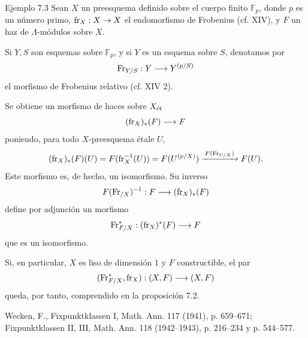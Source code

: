 \begin{statement}{Ejemplo 7.3}
Sean $X$ un preesquema definido sobre el cuerpo finito $\mathbb F_p$, donde $p$ es un número primo, $\operatorname{fr}_X:X\to X$ el endomorfismo de Frobenius (cf. XIV), y $F$ un haz de $\Lambda$-módulos sobre $X$.

Si $Y,S$ son esquemas sobre $\mathbb F_p$, y si $Y$ es un esquema sobre $S$, denotamos por
\[
\operatorname{Fr}_{Y/S}:Y\longrightarrow Y^{(p/S)}
\]
el morfismo de Frobenius relativo (cf. XIV 2).

Se obtiene un morfismo de haces sobre $X_{\mathrm{\acute{e}t}}$
\[
(\operatorname{fr}_X)_*(F)\longrightarrow F
\]
poniendo, para todo $X$-preesquema étale $U$,
\[
(\operatorname{fr}_X)_*(F)(U)=F(\operatorname{fr}_X^{-1}(U))=F(U^{(p/X)})
 \xrightarrow{\,F(\operatorname{Fr}_{U/X})\,}F(U).
\]
Este morfismo es, de hecho, un isomorfismo. Su inverso
\[
F(\operatorname{Fr}_{/X})^{-1}:F\longrightarrow (\operatorname{fr}_X)_*(F)
\]
define por adjunción un morfismo
\[
\operatorname{Fr}_{F/X}^*:(\operatorname{fr}_X)^*(F)\longrightarrow F
\]
que es un isomorfismo.

Si, en particular, $X$ es liso de dimensión $1$ y $F$ constructible, el par
\[
(\operatorname{Fr}_{F/X}^*,\operatorname{fr}_X):(X,F)\longrightarrow (X,F)
\]
queda, por tanto, comprendido en la proposición 7.2.
\end{statement}

\noindent[1] Wecken, F., Fixpunktklassen I, Math. Ann. 117 (1941), p. 659--671; Fixpunktklassen II, III, Math. Ann. 118 (1942--1943), p. 216--234 y p. 544--577.
